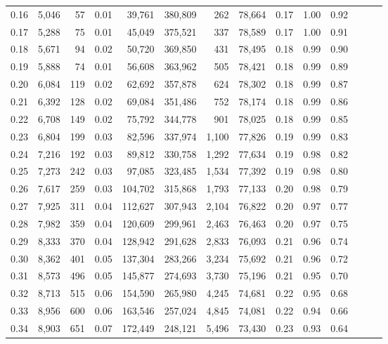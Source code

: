 \begin{tabular}{rrrrrrrrrrrrrr}
0.16 &  5,046 &     57 &  0.01 &   39,761 &  380,809 &     262 &  78,664 &  0.17 &  1.00 &      0.92 \\
0.17 &  5,288 &     75 &  0.01 &   45,049 &  375,521 &     337 &  78,589 &  0.17 &  1.00 &      0.91 \\
0.18 &  5,671 &     94 &  0.02 &   50,720 &  369,850 &     431 &  78,495 &  0.18 &  0.99 &      0.90 \\
0.19 &  5,888 &     74 &  0.01 &   56,608 &  363,962 &     505 &  78,421 &  0.18 &  0.99 &      0.89 \\
0.20 &  6,084 &    119 &  0.02 &   62,692 &  357,878 &     624 &  78,302 &  0.18 &  0.99 &      0.87 \\
0.21 &  6,392 &    128 &  0.02 &   69,084 &  351,486 &     752 &  78,174 &  0.18 &  0.99 &      0.86 \\
0.22 &  6,708 &    149 &  0.02 &   75,792 &  344,778 &     901 &  78,025 &  0.18 &  0.99 &      0.85 \\
0.23 &  6,804 &    199 &  0.03 &   82,596 &  337,974 &   1,100 &  77,826 &  0.19 &  0.99 &      0.83 \\
0.24 &  7,216 &    192 &  0.03 &   89,812 &  330,758 &   1,292 &  77,634 &  0.19 &  0.98 &      0.82 \\
0.25 &  7,273 &    242 &  0.03 &   97,085 &  323,485 &   1,534 &  77,392 &  0.19 &  0.98 &      0.80 \\
0.26 &  7,617 &    259 &  0.03 &  104,702 &  315,868 &   1,793 &  77,133 &  0.20 &  0.98 &      0.79 \\
0.27 &  7,925 &    311 &  0.04 &  112,627 &  307,943 &   2,104 &  76,822 &  0.20 &  0.97 &      0.77 \\
0.28 &  7,982 &    359 &  0.04 &  120,609 &  299,961 &   2,463 &  76,463 &  0.20 &  0.97 &      0.75 \\
0.29 &  8,333 &    370 &  0.04 &  128,942 &  291,628 &   2,833 &  76,093 &  0.21 &  0.96 &      0.74 \\
0.30 &  8,362 &    401 &  0.05 &  137,304 &  283,266 &   3,234 &  75,692 &  0.21 &  0.96 &      0.72 \\
0.31 &  8,573 &    496 &  0.05 &  145,877 &  274,693 &   3,730 &  75,196 &  0.21 &  0.95 &      0.70 \\
0.32 &  8,713 &    515 &  0.06 &  154,590 &  265,980 &   4,245 &  74,681 &  0.22 &  0.95 &      0.68 \\
0.33 &  8,956 &    600 &  0.06 &  163,546 &  257,024 &   4,845 &  74,081 &  0.22 &  0.94 &      0.66 \\
0.34 &  8,903 &    651 &  0.07 &  172,449 &  248,121 &   5,496 &  73,430 &  0.23 &  0.93 &      0.64 \\

\end{tabular}
